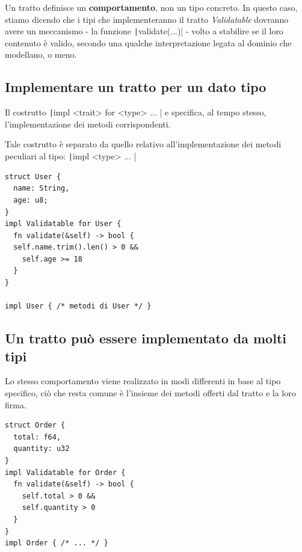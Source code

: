 Un tratto definisce un \textbf{comportamento}, non un tipo concreto.
In questo caso, stiamo dicendo che i tipi che implementeranno il tratto
\textit{Validatable} dovranno avere un meccanismo - la funzione \texttt|validate(...)| - volto
a stabilire se il loro contenuto è valido, secondo una qualche interpretazione
legata al dominio che modellano, o meno.

\subsection{Implementare un tratto per un dato tipo}

\begin{center}
  \begin{minipage}{0.45\linewidth}
    Il costrutto \texttt|impl <trait> for <type> { ... }| e specifica, al
    tempo stesso, l'implementazione dei metodi corrispondenti.

    Tale costrutto è separato da quello relativo all'implementazione dei
    metodi peculiari al tipo: \texttt|impl <type> { ... }|
  \end{minipage}%
  \hfill
  \begin{minipage}{0.45\linewidth}
    \begin{verbatim}
struct User {
  name: String,
  age: u8;
}
impl Validatable for User {
  fn validate(&self) -> bool {
  self.name.trim().len() > 0 &&
    self.age >= 18
  }
}

impl User { /* metodi di User */ }
\end{verbatim}
  \end{minipage}
\end{center}

\subsection{Un tratto può essere implementato da molti tipi}

\begin{center}
  \begin{minipage}{0.45\linewidth}
    Lo stesso comportamento viene realizzato in modi differenti in base al tipo
    specifico, ciò che resta comune è l'insieme dei metodi offerti dal tratto e la
    loro firma.

  \end{minipage}%
  \hfill
  \begin{minipage}{0.45\linewidth}
    \begin{verbatim}
struct Order {
  total: f64,
  quantity: u32
}
impl Validatable for Order {
  fn validate(&self) -> bool {
    self.total > 0 &&
    self.quantity > 0
  }
}
impl Order { /* ... */ }
\end{verbatim}
  \end{minipage}
\end{center}


